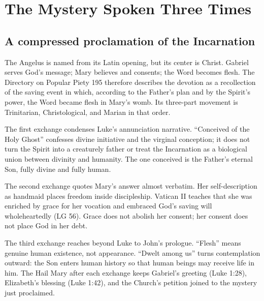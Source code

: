 \section{The Mystery Spoken Three Times}




\subsection{A compressed proclamation of the Incarnation}

The Angelus is named from its Latin opening, but its center is Christ. Gabriel serves God's message; Mary believes and consents; the Word becomes flesh. The Directory on Popular Piety 195 therefore describes the devotion as a recollection of the saving event in which, according to the Father's plan and by the Spirit's power, the Word became flesh in Mary's womb. Its three-part movement is Trinitarian, Christological, and Marian in that order.

The first exchange condenses Luke's annunciation narrative. ``Conceived of the Holy Ghost'' confesses divine initiative and the virginal conception; it does not turn the Spirit into a creaturely father or treat the Incarnation as a biological union between divinity and humanity. The one conceived is the Father's eternal Son, fully divine and fully human.

The second exchange quotes Mary's answer almost verbatim. Her self-description as handmaid places freedom inside discipleship. Vatican II teaches that she was enriched by grace for her vocation and embraced God's saving will wholeheartedly (LG 56). Grace does not abolish her consent; her consent does not place God in her debt.

The third exchange reaches beyond Luke to John's prologue. ``Flesh'' means genuine human existence, not appearance. ``Dwelt among us'' turns contemplation outward: the Son enters human history so that human beings may receive life in him. The Hail Mary after each exchange keeps Gabriel's greeting (Luke 1:28), Elizabeth's blessing (Luke 1:42), and the Church's petition joined to the mystery just proclaimed.


